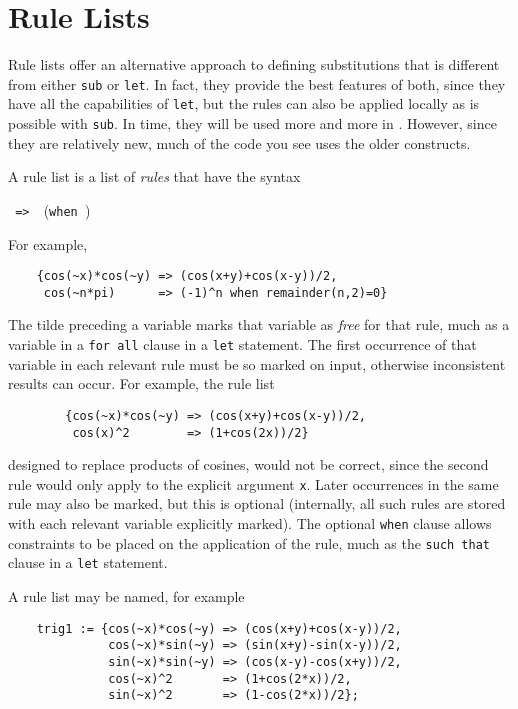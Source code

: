 \section{Rule Lists} 

Rule lists offer an alternative approach to defining substitutions that is
different from either \texttt{sub} or \texttt{let}.  In fact, they provide the
best features of both, since they have all the capabilities of \texttt{let},
but the rules can also be applied locally as is possible with \texttt{sub}.
In time, they will be used more and more in {\REDUCE}.  However, since they
are relatively new, much of the {\REDUCE} code you see uses the older
constructs.

\hypertarget{reserved:WHEN}{}
A rule list is a list of \emph{rules} that have the syntax
\begin{syntax}
     \texttt{ => }\ (\texttt{when })
\end{syntax}
For example,
\begin{verbatim}
    {cos(~x)*cos(~y) => (cos(x+y)+cos(x-y))/2,
     cos(~n*pi)      => (-1)^n when remainder(n,2)=0}
\end{verbatim}

The tilde preceding a variable marks that variable as \emph{free} for that
rule, much as a variable in a \texttt{for all} clause in a \texttt{let}
statement.  The first occurrence of that variable in each relevant rule
must be so marked on input, otherwise inconsistent results can occur.
For example, the rule list
\begin{verbatim}
        {cos(~x)*cos(~y) => (cos(x+y)+cos(x-y))/2,
         cos(x)^2        => (1+cos(2x))/2}
\end{verbatim}
designed to replace products of cosines, would not be correct, since the
second rule would only apply to the explicit argument \texttt{x}.  Later
occurrences in the same rule may also be marked, but this is optional
(internally, all such rules are stored with each relevant variable
explicitly marked).  The optional \texttt{when} clause allows
constraints to be placed on the application of the rule, much as the
\texttt{such that} clause in a \texttt{let} statement.

A rule list may be named, for example
\begin{verbatim}
    trig1 := {cos(~x)*cos(~y) => (cos(x+y)+cos(x-y))/2,
              cos(~x)*sin(~y) => (sin(x+y)-sin(x-y))/2,
              sin(~x)*sin(~y) => (cos(x-y)-cos(x+y))/2,
              cos(~x)^2       => (1+cos(2*x))/2,
              sin(~x)^2       => (1-cos(2*x))/2};
\end{verbatim}

